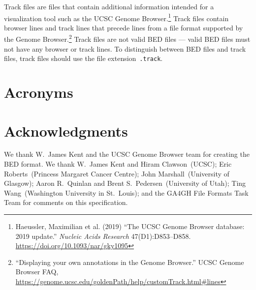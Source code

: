 \documentclass[11pt]{article}
\begin{document}
Track files are files that contain additional information intended for a visualization tool such as the \ac{UCSC} Genome Browser.\footnote{Haeussler, Maximilian et al.
  (2019) ``The \acl{UCSC} Genome Browser database: 2019 update.''
  \emph{Nucleic Acids Research} 47(D1):D853--D858.
  \url{https://doi.org/10.1093/nar/gky1095}}
Track files contain browser lines and track lines that precede lines from a file format supported by the Genome Browser.\footnote{``Displaying your own annotations in the Genome Browser.'' \ac{UCSC} Genome Browser FAQ, \url{https://genome.ucsc.edu/goldenPath/help/customTrack.html\#lines}}
Track files are not valid \ac{BED} files --- valid \ac{BED} files must not have any browser or track lines.
To distinguish between \ac{BED} files and track files, track files should use the file extension~\texttt{.track}.

\section{Acronyms}
\begin{acronym}[ASCII]
\end{acronym}

\section{Acknowledgments}

We thank W.~James Kent and the \ac{UCSC} Genome Browser team for creating the \ac{BED} format.
We thank W.~James Kent and Hiram Clawson~(\ac{UCSC}); Eric Roberts~(Princess Margaret Cancer Centre); John Marshall~(University of Glasgow); Aaron R.~Quinlan and Brent S.~Pedersen~(University of Utah); Ting Wang~(Washington University in St.~Louis); and the \ac{GA4GH} File Formats Task Team for comments on this specification.
\end{document}
